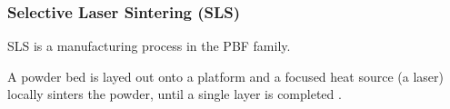 \documentclass[a4paper]{article}
\begin{document}
%
%
%
%

    \subsubsection{Selective Laser Sintering (SLS) \label{SLS_general}}

    SLS is a manufacturing process in the PBF family. 

    A powder bed is layed out onto a platform and a focused heat source (a laser) locally sinters the powder, 
    until a single layer is completed \autocites*{Recent_progress_polymers_AM}{Kovalcik_PHA_Review}. 
\end{document}
